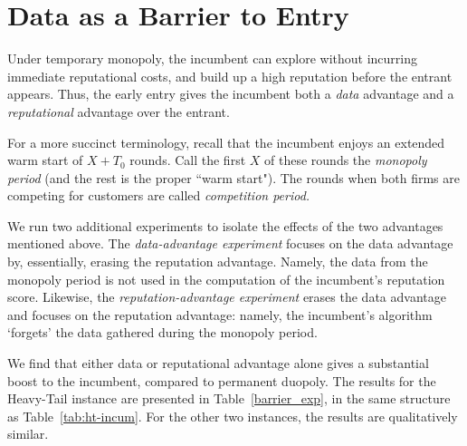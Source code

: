 \documentclass[../competing_bandits_with_appendix.tex]{subfiles}
\begin{document}
\section{Data as a Barrier to Entry}\label{section:6}


Under temporary monopoly, the incumbent can explore without incurring immediate reputational costs, and build up a high reputation before the entrant appears. Thus, the early entry gives the incumbent both a \textit{data} advantage and a \textit{reputational} advantage over the entrant. 

For a more succinct terminology, recall that the incumbent enjoys an extended warm start of $X+T_0$ rounds. Call the first $X$ of these rounds the \emph{monopoly period} (and the rest is the proper ``warm start"). The rounds when both firms are competing for customers are called \emph{competition period.}

We run two additional experiments to isolate the effects of the two
advantages mentioned above. The \emph{data-advantage experiment} focuses on the data advantage by, essentially, erasing the reputation advantage. Namely, the data from the monopoly period is not used in the computation of the incumbent's reputation score. Likewise, the \emph{reputation-advantage experiment} erases the data advantage and focuses on the reputation advantage: namely, the incumbent's algorithm `forgets' the data gathered during the monopoly period.

We find that either data or reputational advantage alone gives a substantial boost to the incumbent, compared to permanent duopoly. The results for the Heavy-Tail instance are presented in Table~\ref{barrier_exp}, in the same structure as Table~\ref{tab:ht-incum}. For the other two instances, the results are qualitatively similar.
\end{document}

